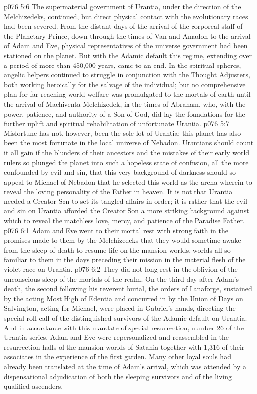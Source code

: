 \vs p076 5:6 \pc The supermaterial government of Urantia, under the direction of the Melchizedeks, continued, but direct physical contact with the evolutionary races had been severed. From the distant days of the arrival of the corporeal staff of the Planetary Prince, down through the times of Van and Amadon to the arrival of Adam and Eve, physical representatives of the universe government had been stationed on the planet. But with the Adamic default this regime, extending over a period of more than 450,000 years, came to an end. In the spiritual spheres, angelic helpers continued to struggle in conjunction with the Thought Adjusters, both working heroically for the salvage of the individual; but no comprehensive plan for far\hyp{}reaching world welfare was promulgated to the mortals of earth until the arrival of Machiventa Melchizedek, in the times of Abraham, who, with the power, patience, and authority of a Son of God, did lay the foundations for the further uplift and spiritual rehabilitation of unfortunate Urantia.
\vs p076 5:7 Misfortune has not, however, been the sole lot of Urantia; this planet has also been the most fortunate in the local universe of Nebadon. Urantians should count it all gain if the blunders of their ancestors and the mistakes of their early world rulers so plunged the planet into such a hopeless state of confusion, all the more confounded by evil and sin, that this very background of darkness should so appeal to Michael of Nebadon that he selected this world as the arena wherein to reveal the loving personality of the Father in heaven. It is not that Urantia needed a Creator Son to set its tangled affairs in order; it is rather that the evil and sin on Urantia afforded the Creator Son a more striking background against which to reveal the matchless love, mercy, and patience of the Paradise Father.
\vs p076 6:1 Adam and Eve went to their mortal rest with strong faith in the promises made to them by the Melchizedeks that they would sometime awake from the sleep of death to resume life on the mansion worlds, worlds all so familiar to them in the days preceding their mission in the material flesh of the violet race on Urantia.
\vs p076 6:2 They did not long rest in the oblivion of the unconscious sleep of the mortals of the realm. On the third day after Adam’s death, the second following his reverent burial, the orders of Lanaforge, sustained by the acting Most High of Edentia and concurred in by the Union of Days on Salvington, acting for Michael, were placed in Gabriel’s hands, directing the special roll call of the distinguished survivors of the Adamic default on Urantia. And in accordance with this mandate of special resurrection, number 26 of the Urantia series, Adam and Eve were repersonalized and reassembled in the resurrection halls of the mansion worlds of Satania together with 1,316 of their associates in the experience of the first garden. Many other loyal souls had already been translated at the time of Adam’s arrival, which was attended by a dispensational adjudication of both the sleeping survivors and of the living qualified ascenders.
